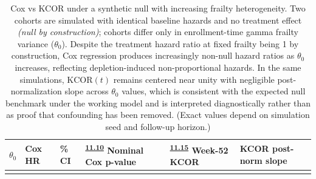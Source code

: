 \documentclass[
]{article}
\begin{document}
\begin{longtable}[]{@{}
  >{\raggedleft\arraybackslash}p{}
  >{\raggedleft\arraybackslash}p{}
  >{\raggedleft\arraybackslash}p{}
  >{\raggedleft\arraybackslash}p{}
  >{\raggedleft\arraybackslash}p{}
  >{\raggedleft\arraybackslash}p{}@{}}
\caption{Cox vs KCOR under a synthetic null with increasing frailty heterogeneity. Two cohorts are simulated with identical baseline hazards and no treatment effect \emph{(null by construction)}; cohorts differ only in enrollment-time gamma frailty variance (\(\theta_0\)). Despite the treatment hazard ratio at fixed frailty being 1 by construction, Cox regression produces increasingly non-null hazard ratios as \(\theta_0\) increases, reflecting depletion-induced non-proportional hazards. In the same simulations, \(\mathrm{KCOR}(t)\) remains centered near unity with negligible post-normalization slope across \(\theta_0\) values, which is consistent with the expected null benchmark under the working model and is interpreted diagnostically rather than as proof that confounding has been removed. (Exact values depend on simulation seed and follow-up horizon.)}\label{tbl:cox_bias_demo}\tabularnewline
\toprule\noalign{}
\begin{minipage}[b]{\linewidth}\raggedleft
\(\theta_0\)
\end{minipage} & \begin{minipage}[b]{\linewidth}\raggedleft
Cox HR
\end{minipage} & \begin{minipage}[b]{\linewidth}\raggedleft
95\% CI
\end{minipage} & \begin{minipage}[b]{\linewidth}\raggedleft
\textsuperscript{\hyperlink{issue-11.10}{11.10}} {\color{red} Nominal Cox p-value}
\end{minipage} & \begin{minipage}[b]{\linewidth}\raggedleft\textsuperscript{\hyperlink{issue-11.15}{11.15}} {\color{red} Week-52 KCOR}
\end{minipage} & \begin{minipage}[b]{\linewidth}\raggedleft
KCOR post-norm slope
\end{minipage} \\
\midrule\noalign{}
\endfirsthead
\toprule\noalign{}

\end{longtable}
\end{document}
